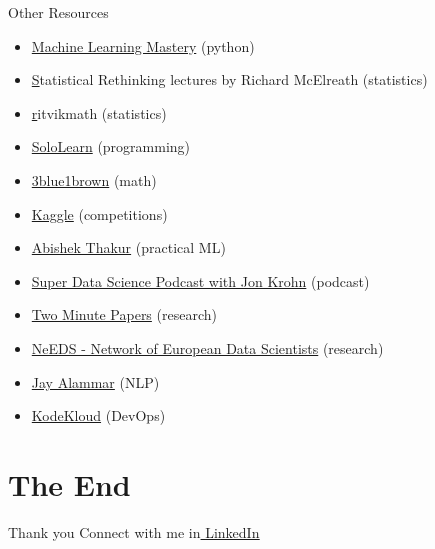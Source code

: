 \documentclass[compress,brown]{beamer}
\begin{document}
\begin{frame}{Other Resources}
\begin{itemize}
	\item \href{https://machinelearningmastery.com/}{Machine Learning Mastery} (python)
	\item \href{https://www.youtube.com/channel/UCNJK6_DZvcMqNSzQdEkzvzA} Statistical Rethinking lectures by Richard McElreath (statistics)  	
	\item \href{https://www.youtube.com/c/ritvikmath} ritvikmath (statistics) 	
	\item \href{https://www.sololearn.com/home}{SoloLearn} (programming)
	\item \href{https://www.youtube.com/c/3blue1brown}{3blue1brown} (math)
	\item \href{https://www.kaggle.com/}{Kaggle} (competitions)
	\item \href{https://www.youtube.com/c/AbhishekThakurAbhi}{Abishek Thakur} (practical ML) 
	\item \href{https://www.youtube.com/c/SuperDataSciencePodcastwithJonKrohn}{Super Data Science Podcast with Jon Krohn} (podcast)
	\item \href{https://www.youtube.com/c/K\%C3\%A1rolyZsolnai}{Two Minute Papers} (research)
	\item \href{https://www.youtube.com/c/NeEDSNetworkofEuropeanDataScientists}{NeEDS - Network of European Data Scientists} (research)
	\item \href{https://www.youtube.com/channel/UCmOwsoHty5PrmE-3QhUBfPQ}{Jay Alammar} (NLP)
	\item \href{https://www.youtube.com/c/KodeKloud}{KodeKloud} (DevOps)
\end{itemize}
\end{frame}

\section{The End}
	\begin{frame}{Thank you}
	\vspace{-0.3cm}	
	\center 
	Connect with me in\href{https://www.linkedin.com/in/vitali-avagyan-a1566234/}{ \underline{LinkedIn}}  
	
	
\end{frame}
\end{document}
